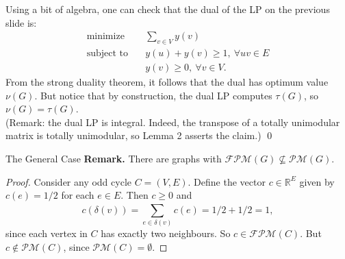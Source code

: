 \begin{frame}
Using a bit of algebra, one can check that the dual of the LP on the previous slide is: \pause
\begin{align*}
\text{minimize} \quad & \sum_{v \in V}^{} y(v)  \\
\text{subject to} \quad & y(u) + y(v) \geq 1 , \ \forall uv \in E \\
& y(v) \geq 0, \ \forall v \in V.
\end{align*}
\pause From the strong duality theorem, it follows that the dual has optimum value \( \nu (G) \). \pause But notice that by construction, the dual LP computes \( \tau (G) \), so \( \nu (G) = \tau (G) \).\pause \\
\vspace{0.4cm}
(Remark: the dual LP is integral. Indeed, the transpose of a totally unimodular matrix is totally unimodular, so Lemma 2 asserts the claim.) \qed
\end{frame}

\begin{frame}{The General Case}
\textbf{Remark.} There are graphs with \(\mathcal{FPM} (G) \not\subseteq \mathcal{PM} (G) \). \pause
\begin{proof}
Consider any odd cycle \( C = (V,E) \). Define the vector \( c \in \mathbb{R}^{E}  \) given by \( c(e) = 1/2 \) for each \( e \in E \). \pause Then \( c \geq 0 \) and \[ c(\delta (v)) = \sum_{e \in \delta (v)}^{} c(e) = 1/2 + 1/2 = 1,  \] since each vertex in \( C \) has exactly two neighbours. \pause So \( c \in \mathcal{FPM} (C) \). But \( c \notin \mathcal{PM} (C) \), since \( \mathcal{PM} (C) = \emptyset   \).
\end{proof}
\end{frame}
